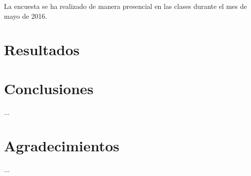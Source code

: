 \documentclass[runningheads,a4paper]{llncs}
\begin{document}
La encuesta se ha realizado de manera presencial en las clases durante el mes de mayo de 2016.

\section{Resultados}
\label{sec:resultados}

\section{Conclusiones}
\label{sec:conclusiones}

...


\section*{Agradecimientos} 

...


%




\end{document}
